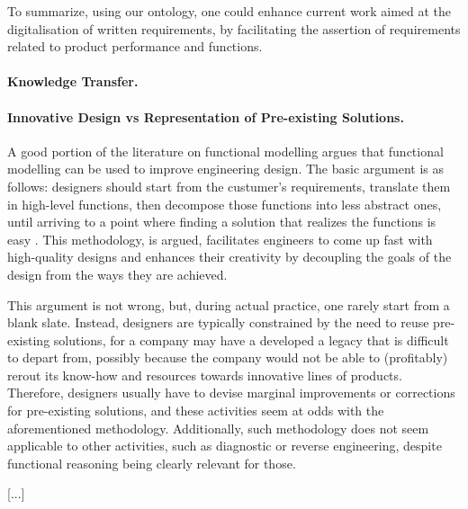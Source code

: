 \documentclass[sw]{iosart2x}
\newcommand{\TODO}[1]{{\color{red} #1
}}
\begin{document}
{To summarize, using our ontology, one could enhance current work aimed at the digitalisation of written requirements, by facilitating the assertion of requirements related to product performance and functions.

\paragraph{Knowledge Transfer.}

\paragraph{Innovative Design vs Representation of Pre-existing Solutions.}
A good portion of the literature on functional modelling argues that functional modelling can be used to improve engineering design.
The basic argument is as follows: designers should start from the custumer's requirements, translate them in high-level functions, then decompose those functions into less abstract ones, until arriving to a point where finding a solution that realizes the functions is easy \TODO{\cite{..}}.
This methodology, is argued, facilitates engineers to come up fast with high-quality designs and enhances their creativity by decoupling the goals of the design from the ways they are achieved.

This argument is not wrong, but, during actual practice, one rarely start from a blank slate. 
Instead, designers are typically constrained by the need to reuse pre-existing solutions, for a company may have a developed a legacy that is difficult to depart from, possibly because the company would not be able to (profitably) rerout its know-how and resources towards innovative lines of products.
Therefore, designers usually have to devise marginal improvements or corrections for pre-existing solutions, and these activities seem at odds with the aforementioned methodology. %
Additionally, such methodology does not seem applicable to other activities, such as diagnostic or reverse engineering, despite functional reasoning being clearly relevant for those. \cite{}

[...]

 



}
\end{document}
